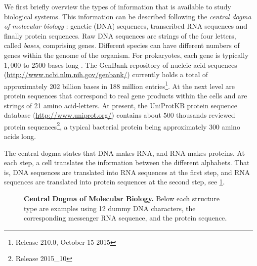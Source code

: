 We first briefly overview the types of information that is available to study biological systems.
This information can be described following the \emph{central dogma of molecular biology} \parencite{crick1970central}: genetic (DNA) sequences, transcribed RNA sequences and finally protein sequences.
Raw DNA sequences are strings of the four letters, called \emph{bases}, comprising genes. Different species can have different numbers of genes within the genome of the organism.
For prokaryotes, each gene is typically $1,000$ to $2500$ bases long \parencite{xu2006average}.
The GenBank repository of nucleic acid sequences (\url{http://www.ncbi.nlm.nih.gov/genbank/}) currently holds a total of approximately 202 billion bases in 188 million entries\footnote{Release 210.0, October 15 2015}.
At the next level are protein sequences that correspond to real gene products within the cells and are strings of 21 amino acid-letters.
At present, the UniProtKB protein sequence database (\url{http://www.uniprot.org/}) contains about 500 thousands reviewed protein sequences\footnote{Release 2015\_10}, a typical bacterial protein being approximately 300 amino acids long.

The central dogma states that DNA makes RNA, and RNA makes proteins.
At each step, a cell translates the information between the different alphabets.
That is, DNA sequences are translated into RNA sequences at the first step, and RNA sequences are translated into protein sequences at the second step, see \cref{fig:centraldogma}.

\begin{figure}[ht]
\centering
{}
\caption[Central Dogma of Biology]{\textbf{Central Dogma of Molecular Biology.} Below each structure type are examples using 12 dummy DNA characters, the corresponding messenger RNA sequence, and the protein sequence.}
\label{fig:centraldogma}
\end{figure}

